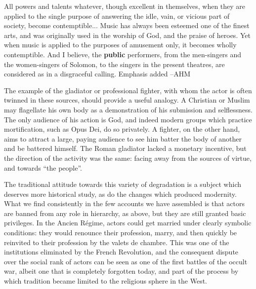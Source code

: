 \begin{quotex}
All powers and talents whatever, though excellent in themselves, when they are applied to the single purpose of answering the idle, vain, or vicious part of society, become contemptible... Music has always been esteemed one of the finest arts, and was originally used in the worship of God, and the praise of heroes. Yet when music is applied to the purposes of amusement only, it becomes wholly contemptible. And I believe, the \textbf{public} performers, from the men-singers and the women-singers of Solomon, to the singers in the present theatres, are considered as in a disgraceful calling. Emphasis added --AHM 
\end{quotex}


The example of the gladiator or professional fighter, with whom the actor is often twinned in these sources, should provide a useful analogy. A Christian or Muslim may flagellate his own body as a demonstration of his submission and selflessness. The only audience of his action is God, and indeed modern groups which practice mortification, such as Opus Dei, do so privately. A fighter, on the other hand, aims to attract a large, paying audience to see him batter the body of another and be battered himself. The Roman gladiator lacked a monetary incentive, but the direction of the activity was the same: facing away from the sources of virtue, and towards ``the people''.

The traditional attitude towards this variety of degradation is a subject which deserves more historical study, as do the changes which produced modernity. What we find consistently in the few accounts we have assembled is that actors are banned from any role in hierarchy, as above, but they are still granted basic privileges. In the Ancien Régime, actors could get married under clearly symbolic conditions: they would renounce their profession, marry, and then quickly be reinvited to their profession by the valets de chambre. This was one of the institutions eliminated by the French Revolution, and the consequent dispute over the social rank of actors can be seen as one of the first battles of the occult war, albeit one that is completely forgotten today, and part of the process by which tradition became limited to the religious sphere in the West.

